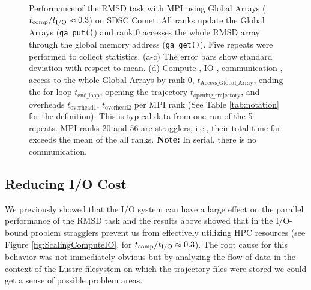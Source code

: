 \begin{figure}[ht!]
\caption{Performance of the RMSD task with MPI using Global Arrays (${t}_{\text{comp}}/{t}_{\text{I/O}} \approx 0.3$) on SDSC Comet.
All ranks update the Global Arrays (\texttt{ga\_put()}) and rank 0 accesses the whole RMSD array through the global memory address (\texttt{ga\_get()}).
Five repeats were performed to collect statistics. (a-c) The error bars show standard deviation with respect to mean. 
(d) Compute \tcomp, IO \tIO, communication \tcomm, access to the whole Global Arrays by rank 0, $t_{\text{Access\_Global\_Array}}$, ending the for loop $t_{\text{end\_loop}}$,
  opening the trajectory $t_{\text{opening\_trajectory}}$, and overheads $t_{\text{overhead1}}$, $t_{\text{overhead2}}$ per MPI rank (See Table \ref{tab:notation} for the definition). 
  This is typical data from one run of the 5 repeats. MPI ranks 20 and 56 are stragglers, i.e., 
their total time far exceeds the mean of the all ranks. \textbf{Note:} In serial, there is no communication.}
\label{fig:MPIwithIO-ga4py}
\end{figure}

\subsection{Reducing I/O Cost}
\label{sec:I/O}

We previously showed that the I/O system can have a large effect on the parallel performance of the RMSD task \cite{Khoshlessan:2017ab} and the results above showed that in the I/O-bound problem stragglers prevent us from effectively utilizing HPC resources (see Figure \ref{fig:ScalingComputeIO}, for ${t}_{\text{comp}}/{t}_{\text{I/O}} \approx 0.3$).
The root cause for this behavior was not immediately obvious but by analyzing the flow of data in the context of the Lustre filesystem on which the trajectory files were stored  we could get a sense of possible problem areas.

